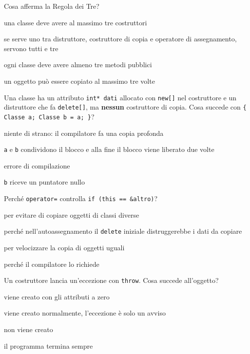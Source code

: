 \begin{quiz}{Cosa afferma la Regola dei Tre?}
  \item una classe deve avere al massimo tre costruttori
  \item se serve uno tra distruttore, costruttore di copia e operatore di assegnamento, servono tutti e tre
  \item ogni classe deve avere almeno tre metodi pubblici
  \item un oggetto può essere copiato al massimo tre volte
\end{quiz}

\begin{quiz}{Una classe ha un attributo \texttt{int* dati} allocato con \texttt{new[]} nel costruttore e un distruttore che fa \texttt{delete[]}, ma \textbf{nessun} costruttore di copia. Cosa succede con \texttt{\{ Classe a; Classe b = a; \}}?}
  \item niente di strano: il compilatore fa una copia profonda
  \item \texttt{a} e \texttt{b} condividono il blocco e alla fine il blocco viene liberato due volte
  \item errore di compilazione
  \item \texttt{b} riceve un puntatore nullo
\end{quiz}

\begin{quiz}{Perché \texttt{operator=} controlla \texttt{if (this == \&altro)}?}
  \item per evitare di copiare oggetti di classi diverse
  \item perché nell'autoassegnamento il \texttt{delete} iniziale distruggerebbe i dati da copiare
  \item per velocizzare la copia di oggetti uguali
  \item perché il compilatore lo richiede
\end{quiz}

\begin{quiz}{Un costruttore lancia un'eccezione con \texttt{throw}. Cosa succede all'oggetto?}
  \item viene creato con gli attributi a zero
  \item viene creato normalmente, l'eccezione è solo un avviso
  \item non viene creato
  \item il programma termina sempre
\end{quiz}


